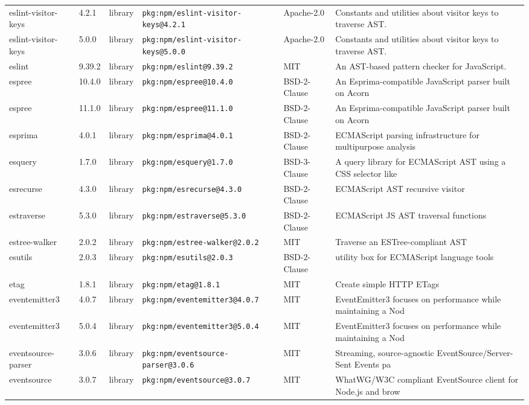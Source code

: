 \documentclass[11pt]{article}
\begin{document}
\begin{longtable}{|l|l|l|p{2.2cm}|l|p{4cm}|}
eslint-visitor-keys & 4.2.1 & library & \texttt{pkg:npm/eslint-visitor-keys@4.2.1} & Apache-2.0 & Constants and utilities about visitor keys to traverse AST. \\
eslint-visitor-keys & 5.0.0 & library & \texttt{pkg:npm/eslint-visitor-keys@5.0.0} & Apache-2.0 & Constants and utilities about visitor keys to traverse AST. \\
eslint & 9.39.2 & library & \texttt{pkg:npm/eslint@9.39.2} & MIT & An AST-based pattern checker for JavaScript. \\
espree & 10.4.0 & library & \texttt{pkg:npm/espree@10.4.0} & BSD-2-Clause & An Esprima-compatible JavaScript parser built on Acorn \\
espree & 11.1.0 & library & \texttt{pkg:npm/espree@11.1.0} & BSD-2-Clause & An Esprima-compatible JavaScript parser built on Acorn \\
esprima & 4.0.1 & library & \texttt{pkg:npm/esprima@4.0.1} & BSD-2-Clause & ECMAScript parsing infrastructure for multipurpose analysis \\
esquery & 1.7.0 & library & \texttt{pkg:npm/esquery@1.7.0} & BSD-3-Clause & A query library for ECMAScript AST using a CSS selector like \\
esrecurse & 4.3.0 & library & \texttt{pkg:npm/esrecurse@4.3.0} & BSD-2-Clause & ECMAScript AST recursive visitor \\
estraverse & 5.3.0 & library & \texttt{pkg:npm/estraverse@5.3.0} & BSD-2-Clause & ECMAScript JS AST traversal functions \\
estree-walker & 2.0.2 & library & \texttt{pkg:npm/estree-walker@2.0.2} & MIT & Traverse an ESTree-compliant AST \\
esutils & 2.0.3 & library & \texttt{pkg:npm/esutils@2.0.3} & BSD-2-Clause & utility box for ECMAScript language tools \\
etag & 1.8.1 & library & \texttt{pkg:npm/etag@1.8.1} & MIT & Create simple HTTP ETags \\
eventemitter3 & 4.0.7 & library & \texttt{pkg:npm/eventemitter3@4.0.7} & MIT & EventEmitter3 focuses on performance while maintaining a Nod \\
eventemitter3 & 5.0.4 & library & \texttt{pkg:npm/eventemitter3@5.0.4} & MIT & EventEmitter3 focuses on performance while maintaining a Nod \\
eventsource-parser & 3.0.6 & library & \texttt{pkg:npm/eventsource-parser@3.0.6} & MIT & Streaming, source-agnostic EventSource/Server-Sent Events pa \\
eventsource & 3.0.7 & library & \texttt{pkg:npm/eventsource@3.0.7} & MIT & WhatWG/W3C compliant EventSource client for Node.js and brow \\

\end{longtable}
\end{document}
